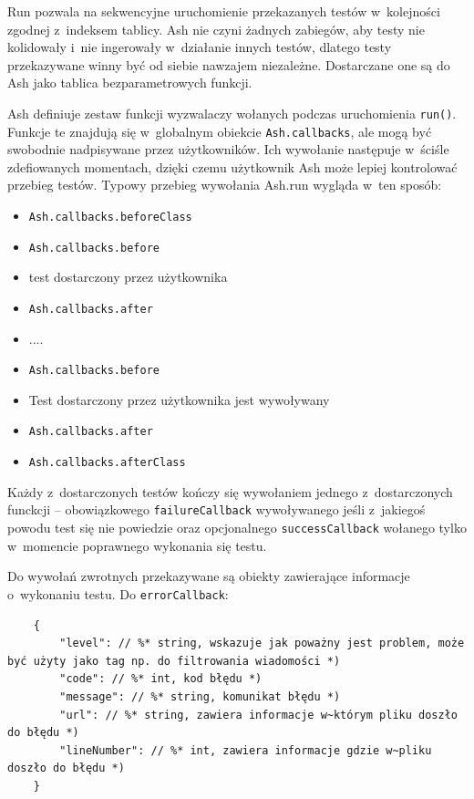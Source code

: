 \documentclass[brudnopis]{xmgr}
\begin{document}
Run pozwala na sekwencyjne uruchomienie przekazanych testów w~kolejności zgodnej z~indeksem tablicy. Ash nie czyni żadnych zabiegów, aby testy nie kolidowały i~nie ingerowały w~działanie innych testów, dlatego testy przekazywane winny być od siebie nawzajem niezależne. Dostarczane one są do Ash jako tablica bezparametrowych funkcji.

Ash definiuje zestaw funkcji wyzwalaczy wołanych podczas uruchomienia \texttt{run()}. Funkcje te znajdują się w~globalnym obiekcie \texttt{Ash.callbacks}, ale mogą być swobodnie nadpisywane przez użytkowników. Ich wywołanie następuje w~ściśle zdefiowanych momentach, dzięki czemu użytkownik Ash może lepiej kontrolować przebieg testów. Typowy przebieg wywołania Ash.run wygląda w~ten sposób:

\begin{itemize}
  \item \texttt{Ash.callbacks.beforeClass}
  \item \texttt{Ash.callbacks.before}
  \item {test dostarczony przez użytkownika}
  \item \texttt{Ash.callbacks.after}
  \item ....
  \item \texttt{Ash.callbacks.before}
  \item Test dostarczony przez użytkownika jest wywoływany
  \item \texttt{Ash.callbacks.after}
  \item \texttt{Ash.callbacks.afterClass}
\end{itemize}

Każdy z~dostarczonych testów kończy się wywołaniem jednego z~dostarczonych funckcji -- obowiązkowego \texttt{failureCallback} wywoływanego jeśli z~jakiegoś powodu test się nie powiedzie oraz opcjonalnego \texttt{successCallback} wołanego tylko w~momencie poprawnego wykonania się testu.

Do wywołań zwrotnych przekazywane są obiekty zawierające informacje o~wykonaniu testu. Do \texttt{errorCallback}:

\begin{lstlisting}
	{
		"level": // %* string, wskazuje jak poważny jest problem, może być użyty jako tag np. do filtrowania wiadomości *)
		"code": // %* int, kod błędu *)
		"message": // %* string, komunikat błędu *) 
		"url": // %* string, zawiera informacje w~którym pliku doszło do błędu *)
		"lineNumber": // %* int, zawiera informacje gdzie w~pliku doszło do błędu *)
	}
\end{lstlisting}
\end{document}
